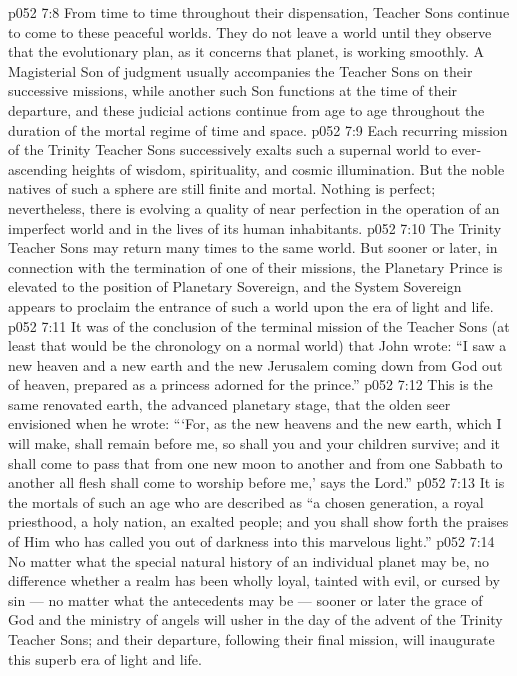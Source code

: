 \vs p052 7:8 \pc From time to time throughout their dispensation, Teacher Sons continue to come to these peaceful worlds. They do not leave a world until they observe that the evolutionary plan, as it concerns that planet, is working smoothly. A Magisterial Son of judgment usually accompanies the Teacher Sons on their successive missions, while another such Son functions at the time of their departure, and these judicial actions continue from age to age throughout the duration of the mortal regime of time and space.
\vs p052 7:9 Each recurring mission of the Trinity Teacher Sons successively exalts such a supernal world to ever\hyp{}ascending heights of wisdom, spirituality, and cosmic illumination. But the noble natives of such a sphere are still finite and mortal. Nothing is perfect; nevertheless, there is evolving a quality of near perfection in the operation of an imperfect world and in the lives of its human inhabitants.
\vs p052 7:10 \pc The Trinity Teacher Sons may return many times to the same world. But sooner or later, in connection with the termination of one of their missions, the Planetary Prince is elevated to the position of Planetary Sovereign, and the System Sovereign appears to proclaim the entrance of such a world upon the era of light and life.
\vs p052 7:11 It was of the conclusion of the terminal mission of the Teacher Sons (at least that would be the chronology on a normal world) that John wrote: “I saw a new heaven and a new earth and the new Jerusalem coming down from God out of heaven, prepared as a princess adorned for the prince.”
\vs p052 7:12 This is the same renovated earth, the advanced planetary stage, that the olden seer envisioned when he wrote: “‘For, as the new heavens and the new earth, which I will make, shall remain before me, so shall you and your children survive; and it shall come to pass that from one new moon to another and from one Sabbath to another all flesh shall come to worship before me,’ says the Lord.”
\vs p052 7:13 It is the mortals of such an age who are described as “a chosen generation, a royal priesthood, a holy nation, an exalted people; and you shall show forth the praises of Him who has called you out of darkness into this marvelous light.”
\vs p052 7:14 \pc No matter what the special natural history of an individual planet may be, no difference whether a realm has been wholly loyal, tainted with evil, or cursed by sin --- no matter what the antecedents may be --- sooner or later the grace of God and the ministry of angels will usher in the day of the advent of the Trinity Teacher Sons; and their departure, following their final mission, will inaugurate this superb era of light and life.
